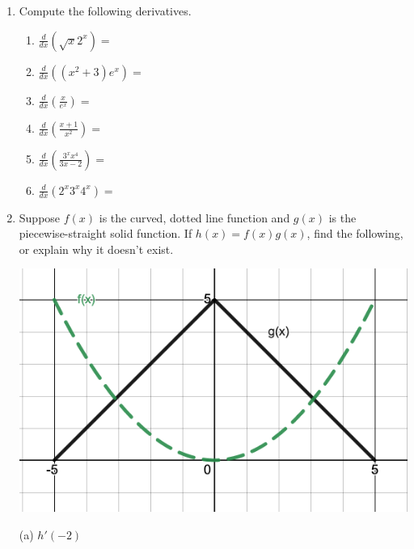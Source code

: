 \documentclass[12pt]{article}
\begin{document}
\begin{enumerate}
\item Compute the following derivatives.

	\begin{multicols}{2}
	\begin{enumerate}[itemsep=1.6cm]
	\item $\displaystyle \frac{d}{dx}\left(\sqrt{x}2^{x}\right)=$

	\item $\displaystyle \frac{d}{dx}\left(\left(x^{2}+3\right)e^{x}\right)=$

	\item $\displaystyle \frac{d}{dx}\left(\frac{x}{e^{x}}\right)=$

	\item $\displaystyle \frac{d}{dx}\left(\frac{x+1}{x^{2}} \right)=$
	
	\item $\displaystyle \frac{d}{dx}\left(\frac{3^xx^4}{3x-2} \right)=$
	
	\item $\displaystyle \frac{d}{dx}\left( 2^x 3^x 4^x \right)=$

	\end{enumerate}
	\end{multicols}
\vfill
\item Suppose $f(x)$ is the curved, dotted line function and $g(x)$ is the piecewise-straight solid function. If $\displaystyle h\left(x\right)=f\left(x\right)g\left(x\right)$, find the following, or explain why it doesn't exist.

\noindent\begin{minipage}{0.3\textwidth}%
\includegraphics[scale=.4]{3_3_piecewise}
\end{minipage}%
\hspace{40mm}
\begin{minipage}{0.6\textwidth}
	(a) $\displaystyle h'\left(-2\right)$\\
	

\end{minipage}
\end{enumerate}
\end{document}
